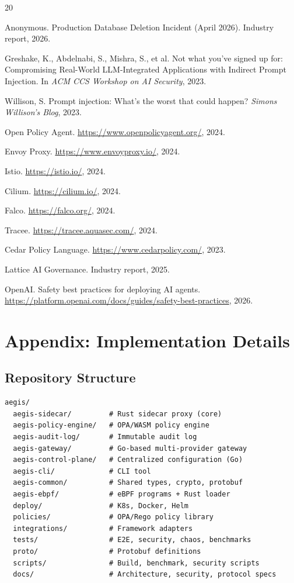 \documentclass[runningheads]{llncs}
\begin{document}
\begin{thebibliography}{20}

 Anonymous. Production Database Deletion Incident (April 2026). Industry report, 2026.

 Greshake, K., Abdelnabi, S., Mishra, S., et al. Not what you've signed up for: Compromising Real-World LLM-Integrated Applications with Indirect Prompt Injection. In \textit{ACM CCS Workshop on AI Security}, 2023.

 Willison, S. Prompt injection: What's the worst that could happen? \textit{Simons Willison's Blog}, 2023.

 Open Policy Agent. \url{https://www.openpolicyagent.org/}, 2024.

 Envoy Proxy. \url{https://www.envoyproxy.io/}, 2024.

 Istio. \url{https://istio.io/}, 2024.

 Cilium. \url{https://cilium.io/}, 2024.

 Falco. \url{https://falco.org/}, 2024.

 Tracee. \url{https://tracee.aquasec.com/}, 2024.

 Cedar Policy Language. \url{https://www.cedarpolicy.com/}, 2023.

 Lattice AI Governance. Industry report, 2025.

 OpenAI. Safety best practices for deploying AI agents. \url{https://platform.openai.com/docs/guides/safety-best-practices}, 2026.

\end{thebibliography}

\appendix

\section{Appendix: Implementation Details}

\subsection{Repository Structure}

\begin{lstlisting}
aegis/
  aegis-sidecar/         # Rust sidecar proxy (core)
  aegis-policy-engine/   # OPA/WASM policy engine
  aegis-audit-log/       # Immutable audit log
  aegis-gateway/         # Go-based multi-provider gateway
  aegis-control-plane/   # Centralized configuration (Go)
  aegis-cli/             # CLI tool
  aegis-common/          # Shared types, crypto, protobuf
  aegis-ebpf/            # eBPF programs + Rust loader
  deploy/                # K8s, Docker, Helm
  policies/              # OPA/Rego policy library
  integrations/          # Framework adapters
  tests/                 # E2E, security, chaos, benchmarks
  proto/                 # Protobuf definitions
  scripts/               # Build, benchmark, security scripts
  docs/                  # Architecture, security, protocol specs
\end{lstlisting}
\end{document}
